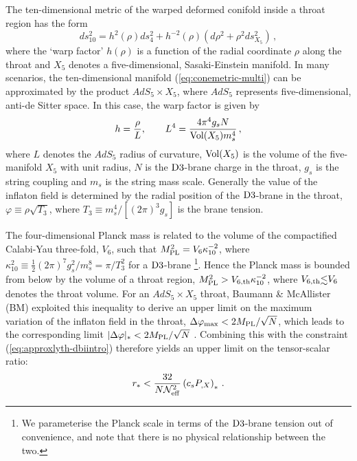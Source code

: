The ten-dimensional metric of the warped deformed conifold inside a  
throat region has the form
%  
\begin{equation}
\label{eq:conemetric-multi}
ds_{10}^2= h^2 ( \rho) ds_4^2 + h^{-2} (\rho ) 
\left( d\rho^2 +\rho^2 ds_{X_5}^2 \right) \,,
\end{equation}
%  
where the `warp factor' $h(\rho )$ is a function of the radial 
coordinate $\rho$ along the throat and $X_5$ denotes a five-dimensional, 
Sasaki-Einstein manifold. In many scenarios, the ten-dimensional 
manifold (\ref{eq:conemetric-multi}) can be approximated by the product 
$AdS_5 \times X_5$, where $AdS_5$ represents five-dimensional, 
anti-de Sitter space. In this case, the warp factor is given by
%   
\begin{equation}
h = \frac{\rho}{L} , \qquad 
L^4 = \frac{4\pi^4 g_s N}{\mathrm{Vol} (X_5) m_s^4}\,,
\end{equation}
%  
where $L$ denotes the $AdS_5$ radius of curvature, 
$\mathrm{Vol} (X_5)$ is the volume of the five-manifold $X_5$ with unit radius, 
$N$ is the ${\rm D3}$-brane charge in the throat, 
$g_s$ is the string coupling and $m_s$ is the string mass scale. 
Generally the value of the inflaton field 
is determined by the radial position of the 
${\rm D3}$-brane in the throat, 
$\varphi \equiv \rho \sqrt{T_3}$, where $T_3 \equiv  
m_s^4/[(2\pi)^3g_s]$ is the brane tension. 


The four-dimensional Planck mass is related to the volume 
of the compactified Calabi-Yau three-fold, $V_6$, such that
$M_{\mathrm{PL}}^2 =V_6 \kappa_{10}^{-2}$, where $\kappa_{10}^2 \equiv \frac{1}{2}
(2 \pi )^7 g_s^2/ m_s^{8} = \pi /T_3^{2}$ for a 
${\rm D3}$-brane \footnote{We parameterise the Planck scale 
in terms of the ${\rm D3}$-brane tension out of convenience, 
and note that there is no physical relationship between the two.}. 
Hence the Planck mass is bounded from 
below by the volume of a throat region, 
$M_{\mathrm{PL}}^2 >V_{6,{\rm th}} \kappa_{10}^{-2}$, 
where $V_{6,{\rm th}} \lsim V_6$ denotes the throat volume. 
For an $AdS_5 \times X_5$ throat, Baumann \& McAllister (BM)
exploited this inequality to derive an upper limit on the 
maximum variation of the inflaton field in the throat, 
$\Delta \varphi_{\rm max} < 2M_{\mathrm{PL}}/\sqrt{N}$, which leads to the 
corresponding limit $|\Delta \varphi |_* < 2M_{\mathrm{PL}} /\sqrt{N}$ \cite{bmpaper}.  
Combining this with the constraint (\ref{eq:approxlyth-dbiintro}) therefore 
yields an upper limit on the tensor-scalar ratio: 
% 
\begin{equation}
\label{eq:BMbound-multi}
r_* < \frac{32}{N {\cal{N}}_{\rm eff}^2} \left( 
c_s P_{,X} \right)_* \,.
\end{equation}
% 


